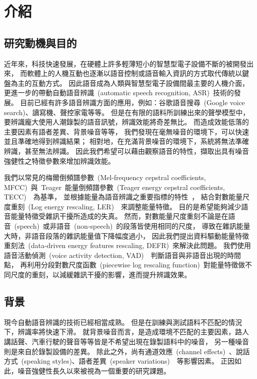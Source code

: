 \chapter{介紹}
\label{ch:introduction}

\section{研究動機與目的}
\label{sec:motivation}
近年來，科技快速發展，在硬體上許多輕薄短小的智慧型電子設備不斷的被開發出來，
而軟體上的人機互動也逐漸以語音控制或語音輸入資訊的方式取代傳統以鍵盤為主的互動方式。
因此語音成為人類與智慧型電子設備間最主要的人機介面，更進一步的帶動自動語音辨識~(automatic speech recognition, ASR)~技術的發展。
目前已經有許多語音辨識方面的應用，例如：谷歌語音搜尋~(Google voice search)、讀寫機、聲控家電等等。
但是在有限的語料所訓練出來的聲學模型中，要辨識龐大使用人潮錄製的語音訊號，辨識效能將奇差無比。
而造成效能低落的主要因素有語者差異、背景噪音等等，
我們發現在毫無噪音的環境下，可以快速並且準確地得到辨識結果；
相對地，在充滿背景噪音的環境下，系統將無法準確辨識，甚至無法辨識。
因此我們希望可以藉由觀察語音的特性，擷取出具有噪音強健性之特徵參數來增加辨識效能。

我們以常見的梅爾倒頻譜參數~(Mel-frequency cepstral coefficients, MFCC)~與~Teager~能量倒頻譜參數~(Teager energy cepstral coefficients, TECC)~\cite{Dimitrios2011}~為基準，
並根據能量為語音辨識之重要指標的特性~\cite{Zhu2005,Hwang2004,Ahadi2004,Chengalvarayan1999}，
結合對數能量尺度重刻~(Log energy rescaling, LER)~\cite{chen2007}~來調整能量特徵。
目的是希望能夠減少語音能量特徵受雜訊干擾所造成的失真。
然而，對數能量尺度重刻不論是在語音~(speech)~或非語音~(non-speech)~的段落皆使用相同的尺度，
導致在雜訊能量大時，非語音段落的雜訊能量值下降幅度過小，
因此我們提出資料驅動能量特徵重刻法~(data-driven energy features rescaling, DEFR)~來解決此問題。
我們使用語音活動偵測~(voice activity detection, VAD)~\cite{tu2007}~判斷語音與非語音出現的時間點，
再利用分段對數尺度函數~(piecewise log rescaling function)~對能量特徵做不同尺度的重刻，以減緩雜訊干擾的影響，進而提升辨識效果。

\section{背景}
\label{sec:backgroup}
現今自動語音辨識的技術已經相當成熟。
但是在訓練與測試語料不匹配的情況下，辨識率將快速下滑。
就背景噪音而言，是造成環境不匹配的主要因素，路人講話聲、汽車行駛的聲音等等皆是不希望出現在錄製語料中的噪音，
另一種噪音則是來自於錄製設備的差異。
除此之外，尚有通道效應~(channel effects)~\cite{Garreton2010}、說話方式~(speaking styles)、語者差異~(speaker variations)~\cite{Huang1992}~等影響因素。
正因如此，噪音強健性長久以來被視為一個重要的研究課題。

